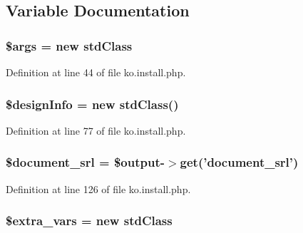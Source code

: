 \subsection{Variable Documentation}
\hypertarget{ko_8install_8php_a67e94494731d99ed23b123e95175bc10}{
\subsubsection[{\$args}]{\setlength{\rightskip}{0pt plus 5cm}\$args = new std\+Class}}\label{ko_8install_8php_a67e94494731d99ed23b123e95175bc10}


Definition at line 44 of file ko.\+install.\+php.

\hypertarget{ko_8install_8php_a99e144f7d563ceb76b003d54739b3b0c}{
\subsubsection[{\$design\+Info}]{\setlength{\rightskip}{0pt plus 5cm}\$design\+Info = new std\+Class()}}\label{ko_8install_8php_a99e144f7d563ceb76b003d54739b3b0c}


Definition at line 77 of file ko.\+install.\+php.

\hypertarget{ko_8install_8php_a14522e7fff0604a8372c75b4a0fbc0fd}{
\subsubsection[{\$document\+\_\+srl}]{\setlength{\rightskip}{0pt plus 5cm}\$document\+\_\+srl = \$output-\/$>$get('document\+\_\+srl')}}\label{ko_8install_8php_a14522e7fff0604a8372c75b4a0fbc0fd}


Definition at line 126 of file ko.\+install.\+php.

\hypertarget{ko_8install_8php_ae9f3d13d48d464400201d7ec024d3a45}{
\subsubsection[{\$extra\+\_\+vars}]{\setlength{\rightskip}{0pt plus 5cm}\${\bf extra\+\_\+vars} = new std\+Class}}\label{ko_8install_8php_ae9f3d13d48d464400201d7ec024d3a45}


